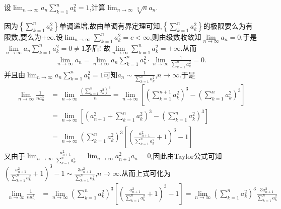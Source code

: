 \documentclass[../../main.tex]{subfiles}
\begin{document}
\begin{example}
设\(\lim_{n \to \infty} a_n \sum\limits_{k = 1}^{n} a_{k}^{2} = 1\),计算\(\lim_{n \to \infty} \sqrt[3]{n}a_n\).
\end{example}
\begin{solution}
因为\(\left\{\sum\limits_{k = 1}^n{a_{k}^{2}}\right\}\)单调递增,故由单调有界定理可知,\(\left\{\sum\limits_{k = 1}^n{a_{k}^{2}}\right\}\)的极限要么为有限数,要么为\(+\infty\).设\(\lim_{n\rightarrow\infty}\sum\limits_{k = 1}^n{a_{k}^{2}}=c <\infty\),则由级数收敛知$\lim\limits_{n\rightarrow \infty}a_n=0$,于是$\lim\limits_{n\rightarrow \infty}a_n\sum_{k=1}^n{a_{k}^{2}}=0\ne 1$矛盾!
故$\lim\limits_{n\rightarrow \infty}\sum_{k=1}^n{a_{k}^{2}}=+\infty$.从而
\begin{align*}
\lim\limits_{n\rightarrow \infty}a_n=\lim\limits_{n\rightarrow \infty}a_n\sum_{k=1}^n{a_{k}^{2}}\cdot \lim\limits_{n\rightarrow \infty}\frac{1}{\sum\limits_{k=1}^n{a_{k}^{2}}}=0.
\end{align*}
并且由\(\lim_{n\rightarrow\infty}a_n\sum\limits_{k = 1}^n{a_{k}^{2}}=1\)可知\(a_n\sim\frac{1}{\sum\limits_{k = 1}^n{a_{k}^{2}}}\),\(n\rightarrow\infty\).于是
\begin{align*}
\lim_{n\rightarrow\infty}\frac{1}{na_{n}^{3}}&=\lim_{n\rightarrow\infty}\frac{\left(\sum\limits_{k = 1}^n{a_{k}^{2}}\right)^3}{n}=\lim_{n\rightarrow\infty}\left[\left(\sum\limits_{k = 1}^{n + 1}{a_{k}^{2}}\right)^3-\left(\sum\limits_{k = 1}^n{a_{k}^{2}}\right)^3\right]\\
&=\lim_{n\rightarrow\infty}\left[\left(a_{n + 1}^{2}+\sum\limits_{k = 1}^n{a_{k}^{2}}\right)^3-\left(\sum\limits_{k = 1}^n{a_{k}^{2}}\right)^3\right]\\
&=\lim_{n\rightarrow\infty}\left(\sum\limits_{k = 1}^n{a_{k}^{2}}\right)^3\left[\left(\frac{a_{n + 1}^{2}}{\sum\limits_{k = 1}^n{a_{k}^{2}}}+1\right)^3 - 1\right]
\end{align*}
又由于\(\lim_{n\rightarrow\infty}\frac{a_{n + 1}^{2}}{\sum\limits_{k = 1}^n{a_{k}^{2}}}=\lim_{n\rightarrow\infty}a_{n + 1}^{2}a_n = 0\),因此由Taylor公式可知\(\left(\frac{a_{n + 1}^{2}}{\sum\limits_{k = 1}^n{a_{k}^{2}}}+1\right)^3 - 1\sim\frac{3a_{n + 1}^{2}}{\sum\limits_{k = 1}^n{a_{k}^{2}}}\),\(n\rightarrow\infty\).从而上式可化为
\begin{align*}
\lim_{n\rightarrow\infty}\frac{1}{na_{n}^{3}}&=\lim_{n\rightarrow\infty}\left(\sum\limits_{k = 1}^n{a_{k}^{2}}\right)^3\left[\left(\frac{a_{n + 1}^{2}}{\sum\limits_{k = 1}^n{a_{k}^{2}}}+1\right)^3 - 1\right]=\lim_{n\rightarrow\infty}\left(\sum\limits_{k = 1}^n{a_{k}^{2}}\right)^3\frac{3a_{n + 1}^{2}}{\sum\limits_{k = 1}^n{a_{k}^{2}}}\\

\end{align*}
\end{solution}
\end{document}
